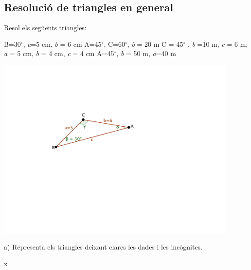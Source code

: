 \subsection{Resolució de triangles en general}
\begin{mylist}
	
	
   	\vspace{-3cm}
\exer \begin{minipage}[t]{0.4\textwidth}
	Resol els següents triangles:  \vspace{0.2cm}
	\begin{tasks}
		\task B=30${}^\circ$, \emph{a}=5 cm, \emph{b} = 6 cm \vspace{0.2cm}
		\task A=45${}^\circ$, C=60${}^\circ$, \emph{b} = 20 m \vspace{0.2cm}
		\task C = 45${}^\circ$ , \emph{b} =10 m, \emph{c} = 6 m;  \vspace{0.2cm}
		\task \emph{a} = 5 cm, \emph{b} = 4 cm, \emph{c} = 4 cm \vspace{0.2cm}
		\task A=45${}^\circ$, \emph{b} = 50 m, \emph{a}=40 m
	\end{tasks}
\end{minipage}
\begin{minipage}{0.45\textwidth}
	
	\vspace{3cm}
	
	\includegraphics[width=0.9\textwidth]{img-03/trig-sample-triangle}
	
	{\footnotesize a) Representa els triangles deixant clares les dades i les incògnites.}
\end{minipage}
	\answers[cols=1]{[
 $A=24.52$; $C=125.38$; $c=9.78$,
$B=75$; $a=14.64$; $c=17.93$,
 No existeix cap triangle,
$A=77.36$; $B=C=51.32$,
Solució 1: $B=62.1$; $C=72.9$; $c=54.1$. 
Solució 2: $B=117.9$; $C=17.1$; $c=16.64$.]}x
	

\end{mylist}
